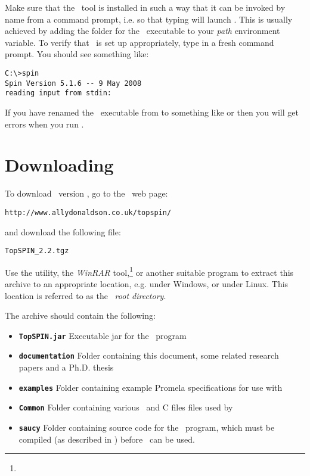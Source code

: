 \vspace{2mm}
%
 Make sure that the \spin\ tool is
installed in such a way that it can be invoked by name from a
command prompt, i.e. so that typing  will launch \spin.
This is usually achieved by adding the folder for the \spin\ executable
to your \emph{path} environment variable.
To verify that \spin\ is set up appropriately, type  in
a fresh command prompt.  You should see something like:
%
\begin{lstlisting}
C:\>spin
Spin Version 5.1.6 -- 9 May 2008
reading input from stdin:
\end{lstlisting}
%
If you have renamed the \spin\ executable from  to
something like  or  then you will
get errors when you run \topspin.
%
\section{Downloading}\label{sec:downloadandinstall:downloading}

To download \topspin\ version \topspinversion, go to the \topspin\
web page:
%
\begin{lstlisting}
http://www.allydonaldson.co.uk/topspin/
\end{lstlisting}
%
and download the following file:
%
\begin{lstlisting}
TopSPIN_2.2.tgz
\end{lstlisting}
%
Use the  utility, the \emph{WinRAR}
tool,\footnote{\texttt{\winrarwebsite}} or another suitable program
to extract this archive to an appropriate location, e.g.
 under Windows, or
 under Linux.  This location is
referred to as the \topspin\ \emph{root directory}.

The archive should contain the following:

\begin{itemize}
\item {\bf \texttt{TopSPIN.jar} } Executable jar for the \topspin\ program
\item {\bf \texttt{documentation} } Folder containing this document, some related research papers
and a Ph.D. thesis
\item {\bf \texttt{examples} } Folder containing example Promela specifications for use with \topspin
\item {\bf \texttt{Common} } Folder containing various \gap\ and C files files used by \topspin
\item {\bf \texttt{saucy} } Folder containing source code for the \saucy\ program, which must be
compiled (as described in
) before
\topspin\ can be used.
\end{itemize}


